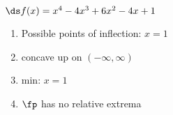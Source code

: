 {$\ds f(x) = x^4-4x^3+6x^2-4x+1$
}
{\begin{enumerate}[label=(\alph*)]
\item Possible points of inflection: $x=1$
\item concave up on $(-\infty,\infty)$
\item min: $x=1$
\item $\fp$ has no relative extrema
\end{enumerate}}
